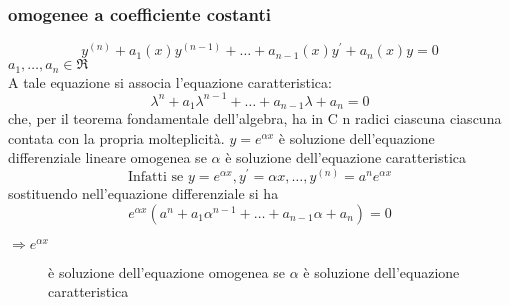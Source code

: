 \subsubsection{omogenee a coefficiente costanti}
\begin{equation}
	y^{(n)}+a_1(x)y^{(n-1)}+\dots+a_{n-1}(x)y^\prime+a_n(x)y=0
\end{equation}
$a_1,\dots,a_n\in \mathfrak{R}$\\
A tale equazione si associa l'equazione caratteristica:
\begin{equation*}
	\lambda^n+a_1\lambda^{n-1}+\dots+a_{n-1}\lambda+a_n=0
\end{equation*}
che, per il teorema fondamentale dell'algebra, ha in C n radici ciascuna ciascuna contata con la propria molteplicità.
$y=e^{\alpha x}$ è soluzione dell'equazione differenziale lineare omogenea se $\alpha$ è soluzione dell'equazione caratteristica
\begin{equation}
	\text{Infatti se } y=e^{\alpha x}, y^\prime=\alpha x, \dots, y^{(n)}=a^ne^{\alpha x}
\end{equation}
 sostituendo nell'equazione differenziale si ha
 \begin{equation}
	e^{\alpha x}(a^n+a_1\alpha^{n-1}+\dots+a_{n-1}\alpha+a_n)=0
\end{equation}
\begin{description}
\item[$\Rightarrow e^{\alpha x}$ ]  è soluzione dell'equazione omogenea se $\alpha$ è soluzione dell'equazione caratteristica
\end{description}
